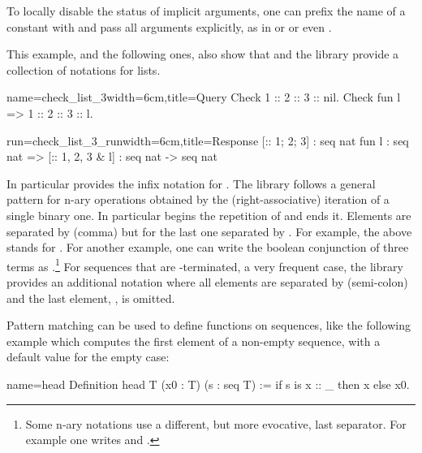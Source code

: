 To locally disable the
status of implicit arguments, one can prefix the name of a
constant with  and pass all arguments explicitly, as in
 or  or even
.

This example, and the following ones, also show
that \Coq{} and the \mcbMC{} library provide
a collection of notations for lists.

\begin{coq-left}{name=check_list_3}{width=6cm,title=Query}
Check 1 :: 2 :: 3 :: nil.
Check fun l => 1 :: 2 :: 3 :: l.
$~$
\end{coq-left}
\begin{coqout-right}{run=check_list_3_run}{width=6cm,title=Response}
[:: 1; 2; 3] : seq nat
fun l : seq nat => [:: 1, 2, 3 & l]
  : seq nat -> seq nat
\end{coqout-right}
\index[coq]{\C{[:: .. , .. & ..]}}

In particular \Coq{} provides the infix notation \C{::} for
.  The \mcbMC{} library follows a general pattern for
n-ary operations obtained by the (right-associative)
iteration of a single binary one. In
particular \C{[::} begins the repetition
of \C{::} and \C{]} ends it.  Elements are separated by \C{,} (comma)
but for the last one separated by \C{&}.
For example, the above \C{[:: 1, 2, 3 & l]} stands for
.
For another example, one
can write  the boolean conjunction
of three terms as .\footnote{Some n-ary
  notations use a different, but more evocative, last separator.  For
  example one writes \C{[|| b1, b2 | b3]} and \C{[==> b1, b2 => b3]}.}
\index[coq]{\C{["|"| .. , .. "| ..]}}
\index[coq]{\C{[&& .. , .. & ..]}}
\index[coq]{\C{[==> .. , .. => ..]}}
For sequences that are -terminated, a very frequent case,
the \mcbMC{} library provides an additional notation where all elements are
separated by \C{;} (semi-colon) and the last element, ,
is omitted.
\index[coq]{\C{[seq .. ; ..]}}

Pattern matching can be used to define functions on sequences, like
the following example which computes the first element of a non-empty
sequence, with a default value for the empty case:

\begin{coq}{name=head}{}
Definition head T (x0 : T) (s : seq T) := if s is x :: _ then x else x0.
\end{coq}


